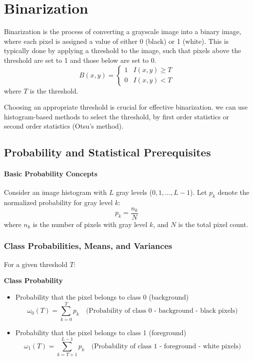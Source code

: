 \section{Binarization}

Binarization is the process of converting a grayscale image into a binary image, where each pixel is assigned a value of either 0 (black) or 1 (white). This is typically done by applying a threshold to the image, such that pixels above the threshold are set to 1 and those below are set to 0.
\[
B(x,y) = \begin{cases}
1 & I(x,y) \geq T \\
0 & I(x,y) < T
\end{cases}
\]
where $T$ is the threshold.

Choosing an appropriate threshold is crucial for effective binarization. we can use histogram-based methods to select the threshold, by first order statistics or second order statistics (Otsu's method).

\subsection{Probability and Statistical Prerequisites}

\paragraph{Basic Probability Concepts}
Consider an image histogram with $L$ gray levels ($0, 1, ..., L-1$). Let $p_k$ denote the normalized probability for gray level $k$:
$$
p_k = \frac{n_k}{N}
$$
where $n_k$ is the number of pixels with gray level $k$, and $N$ is the total pixel count.

\subsubsection{Class Probabilities, Means, and Variances}
For a given threshold $T$:

\noindent \textbf{Class Probability}
\begin{itemize}
\item Probability that the pixel belongs to class 0 (background)
\[
\omega_0(T) = \sum_{k=0}^T p _k \quad\text{(Probability of class 0 - background - black pixels)}
\]
\item Probability that the pixel belongs to class 1 (foreground)
\[\omega_1(T) = \sum_{k=T+1}^{L-1} p_k \quad\text{(Probability of class 1 - foreground - white pixels)} 
\]
\end{itemize}

